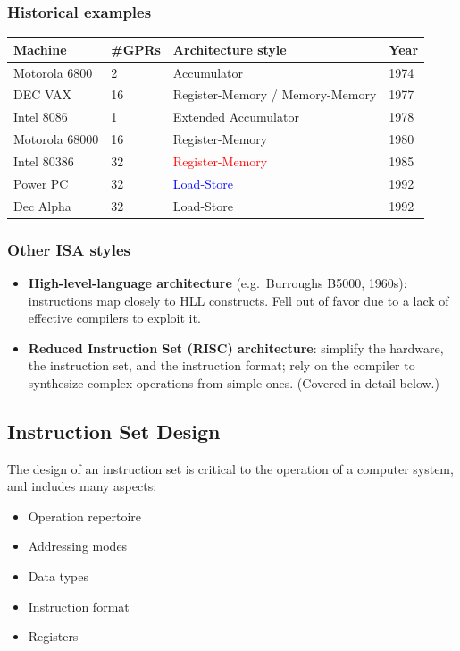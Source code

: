 \subsubsection{Historical examples}

\begin{center}
\begin{tabular}{@{}llll@{}}
\toprule
Machine & \#GPRs & Architecture style & Year \\
\midrule
Motorola 6800 & 2  & Accumulator                    & 1974 \\
DEC VAX       & 16 & Register-Memory / Memory-Memory & 1977 \\
Intel 8086    & 1  & Extended Accumulator            & 1978 \\
Motorola 68000& 16 & Register-Memory                 & 1980 \\
Intel 80386   & 32 & \textcolor{red}{Register-Memory}& 1985 \\
Power PC      & 32 & \textcolor{blue}{Load-Store}    & 1992 \\
Dec Alpha     & 32 & Load-Store                      & 1992 \\
\bottomrule
\end{tabular}
\end{center}

\subsubsection{Other ISA styles}

\begin{itemize}
  \item \textbf{High-level-language architecture} (e.g.\ Burroughs B5000,
  1960s): instructions map closely to HLL constructs. Fell out of favor due
  to a lack of effective compilers to exploit it.
  \item \textbf{Reduced Instruction Set (RISC) architecture}: simplify the
  hardware, the instruction set, and the instruction format; rely on the
  compiler to synthesize complex operations from simple ones. (Covered in
  detail below.)
\end{itemize}

\subsection{Instruction Set Design}
\label{sec:isa-design}

The design of an instruction set is critical to the operation of a computer
system, and includes many aspects:
\begin{itemize}
  \item Operation repertoire
  \item Addressing modes
  \item Data types
  \item Instruction format
  \item Registers
\end{itemize}

